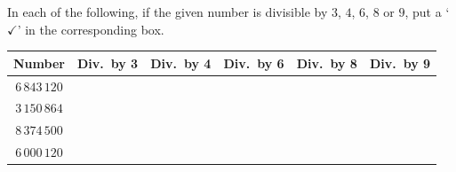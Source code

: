  In each of the following, if the given number is divisible by $3$, $4$, $6$, $8$ or $9$, put a `$\checkmark$' in the corresponding box.
\par\finishquestion

\begin{center}
\small
\begin{tabular}{|c|c|c|c|c|c|}
\hline
\textbf{Number} & \textbf{Div.\ by 3} & \textbf{Div.\ by 4} & \textbf{Div.\ by 6} & \textbf{Div.\ by 8} & \textbf{Div.\ by 9}\\
\hline
$6\,843\,120$ & & & & & \\ \hline
$3\,150\,864$ & & & & & \\ \hline
$8\,374\,500$ & & & & & \\ \hline
$6\,000\,120$ & & & & & \\ \hline
\end{tabular}
\end{center}
